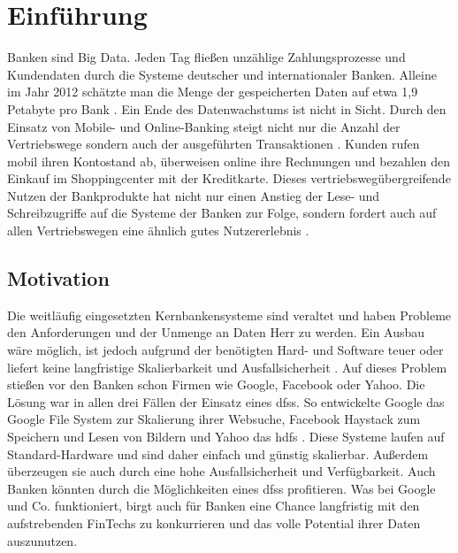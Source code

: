 \documentclass[12pt,oneside,a4paper,parskip]{scrbook}
\begin{document}
\tableofcontents										



\mainmatter


\chapter{Einführung}\label{ch:intro}
Banken sind Big Data. Jeden Tag fließen unzählige Zahlungsprozesse und Kundendaten durch die Systeme deutscher und internationaler Banken. Alleine im Jahr 2012 schätzte man die Menge der gespeicherten Daten auf etwa 1,9 Petabyte pro Bank \cite{datanami}. Ein Ende des Datenwachstums ist nicht in Sicht. Durch den Einsatz von Mobile- und Online-Banking steigt nicht nur die Anzahl der Vertriebswege sondern auch der ausgeführten Transaktionen \cite{DBBigData}. Kunden rufen mobil ihren Kontostand ab, überweisen online ihre Rechnungen und bezahlen den Einkauf im Shoppingcenter mit der Kreditkarte. Dieses vertriebswegübergreifende Nutzen der Bankprodukte hat nicht nur einen Anstieg der Lese- und Schreibzugriffe auf die Systeme der Banken zur Folge, sondern fordert auch auf allen Vertriebswegen eine ähnlich gutes Nutzererlebnis \cite{bankwirtschaft}.

\section{Motivation}
Die weitläufig eingesetzten Kernbankensysteme sind veraltet und haben Probleme den Anforderungen und der Unmenge an Daten Herr zu werden. Ein Ausbau wäre möglich, ist jedoch aufgrund der benötigten Hard- und Software teuer oder liefert keine langfristige Skalierbarkeit und Ausfallsicherheit \cite{herzKernbankensystem}. Auf dieses Problem stießen vor den Banken schon Firmen wie Google, Facebook oder Yahoo. Die Lösung war in allen drei Fällen der Einsatz eines \acp{dfs}. So entwickelte Google das Google File System \cite{GFS} zur Skalierung ihrer Websuche, Facebook Haystack \cite{haystack} zum Speichern und Lesen von Bildern und Yahoo das \ac{hdfs} \cite{hdfs}. Diese Systeme laufen auf Standard-Hardware und sind daher einfach und günstig skalierbar. Außerdem überzeugen sie auch durch eine hohe Ausfallsicherheit und Verfügbarkeit. Auch Banken könnten durch die Möglichkeiten eines \acp{dfs} profitieren. Was bei Google und Co. funktioniert, birgt auch für Banken eine Chance langfristig mit den aufstrebenden FinTechs zu konkurrieren und das volle Potential ihrer Daten auszunutzen\cite{wiki:fintech}.
\end{document}
